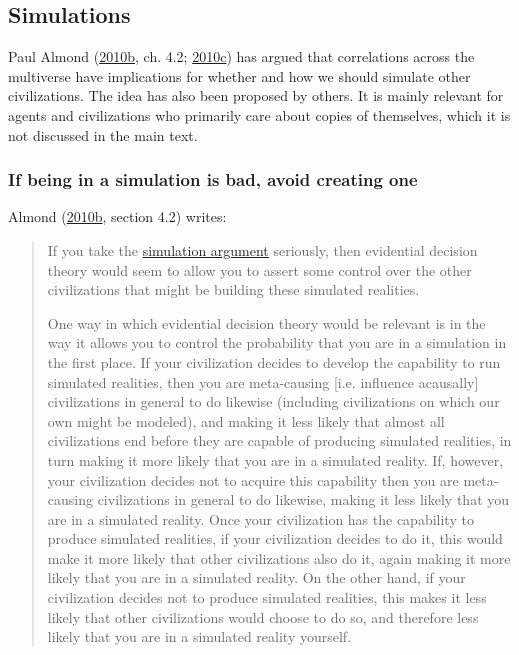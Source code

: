 \hypertarget{simulations}{\subsection{Simulations}\label{simulations}}

Paul Almond
(\href{https://web.archive.org/web/20120310010225/http://www.paul-almond.com/Correlation2.pdf}{2010b},
ch. 4.2;
\href{https://www.researchgate.net/publication/265224117_Can_you_retroactively_put_yourself_in_a_computer_simulation}{2010c})
has argued that correlations across the multiverse have implications for
whether and how we should simulate other civilizations. The idea has
also been proposed by others. It is mainly relevant for agents and
civilizations who primarily care about copies of themselves, which it is
not discussed in the main text.

\subsubsection{If being in a simulation is bad, avoid creating
one}\label{if-being-in-a-simulation-is-bad-avoid-creating-one}

Almond
(\href{https://web.archive.org/web/20120310010225/http://www.paul-almond.com/Correlation2.pdf}{2010b},
section 4.2) writes:

\begin{quote}
If you take the
\href{http://www.simulation-argument.com/}{simulation argument}
seriously, then evidential decision theory would seem to allow you to
assert some control over the other civilizations that might be building
these simulated realities.

One way in which evidential decision theory would be relevant is in the
way it allows you to control the probability that you are in a
simulation in the first place. If your civilization decides to develop
the capability to run simulated realities, then you are meta-causing
{[}i.e. influence acausally{]} civilizations in general to do likewise
(including civilizations on which our own might be modeled), and making
it less likely that almost all civilizations end before they are capable
of producing simulated realities, in turn making it more likely that you
are in a simulated reality. If, however, your civilization decides not
to acquire this capability then you are meta-causing civilizations in
general to do likewise, making it less likely that you are in a
simulated reality. Once your civilization has the capability to produce
simulated realities, if your civilization decides to do it, this would
make it more likely that other civilizations also do it, again making it
more likely that you are in a simulated reality. On the other hand, if
your civilization decides not to produce simulated realities, this makes
it less likely that other civilizations would choose to do so, and
therefore less likely that you are in a simulated reality yourself.
\end{quote}

